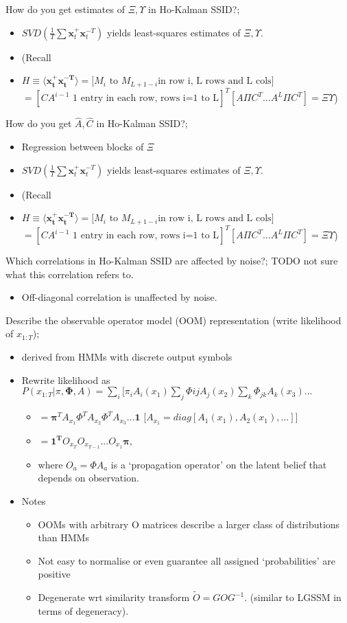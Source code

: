 \documentclass{article}
\begin{document}
How do you get estimates of $\Xi, \Upsilon$ in Ho-Kalman SSID?; \begin{itemize} \item $SVD(\frac{1}{T}\sum\mathbf{x}_t^+\mathbf{x}_t^{-T})$ yields least-squares estimates of $\Xi, \Upsilon$. \item (Recall \item $H\equiv \langle \mathbf{x_t^+ x_t^{-T}}\rangle =\big [ M_i\text{ to }M_{L+1-i}\text{in row i, L rows and L cols} \big]$ $= [CA^{i-1} \text{ 1 entry in each row, rows i=1 to L}]^T [A\Pi C^T...A^L\Pi C^T] = \Xi\Upsilon$) \end{itemize}

How do you get $\hat{A}, \hat{C}$ in Ho-Kalman SSID?; \begin{itemize} \item Regression between blocks of $\Xi$ \item $SVD(\frac{1}{T}\sum\mathbf{x}_t^+\mathbf{x}_t^{-T})$ yields least-squares estimates of $\Xi, \Upsilon$. \item (Recall \item $H\equiv \langle \mathbf{x_t^+ x_t^{-T}}\rangle =\big [ M_i\text{ to }M_{L+1-i}\text{in row i, L rows and L cols} \big]$ $= [CA^{i-1} \text{ 1 entry in each row, rows i=1 to L}]^T [A\Pi C^T...A^L\Pi C^T] = \Xi\Upsilon$) \end{itemize}

Which correlations in Ho-Kalman SSID are affected by noise?; TODO not sure what this correlation refers to. \begin{itemize} \item Off-diagonal correlation is unaffected by noise. \end{itemize}

Describe the observable operator model (OOM) representation (write likelihood of $x_{1:T}$); \begin{itemize} \item derived from HMMs with discrete output symbols \item Rewrite likelihood as $P(x_{1:T}|\pi, \mathbf{\Phi}, A)=\sum_i[\pi_iA_i(x_1)\sum_j\Phi{ij}A_j(x_2)\sum_k\Phi_{jk}A_k(x_3)...$ \begin{itemize} \item $=\mathbf{\pi}^TA_{x_1}\Phi^TA_{x_2}\Phi^T A_{x_3}...\mathbf{1}$ [$A_{x_1}=diag[A_1(x_1), A_2(x_1),...]]$ \item $=\mathbf{1^T}O_{x_T}O_{x_{T-1}}...O_{x_1}\mathbf{\pi}$, \item where $O_a = \Phi A_a$ is a `propagation operator' on the latent belief that depends on observation. \end{itemize} \item Notes \begin{itemize} \item OOMs with arbitrary O matrices describe a larger class of distributions than HMMs \item Not easy to normalise or even guarantee all assigned `probabilities' are positive \item Degenerate wrt similarity transform $\tilde{O}=GOG^{-1}$. (similar to LGSSM in terms of degeneracy). \end{itemize} \end{itemize}
\end{document}
